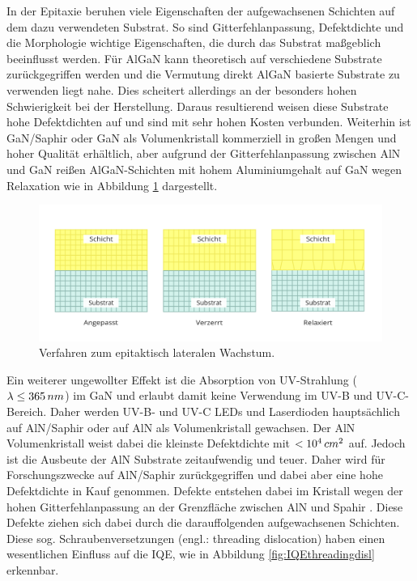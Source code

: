 In der Epitaxie beruhen viele Eigenschaften der aufgewachsenen Schichten auf dem dazu verwendeten Substrat. So sind Gitterfehlanpassung, Defektdichte und die Morphologie wichtige Eigenschaften, die durch das Substrat maßgeblich beeinflusst werden. Für AlGaN kann theoretisch auf verschiedene Substrate zurückgegriffen werden und die Vermutung direkt AlGaN basierte Substrate zu verwenden liegt nahe. Dies scheitert allerdings an der besonders hohen Schwierigkeit bei der Herstellung. Daraus resultierend weisen diese Substrate hohe Defektdichten auf und sind mit sehr hohen Kosten verbunden. Weiterhin ist GaN/Saphir oder GaN als Volumenkristall kommerziell in großen Mengen und hoher Qualität erhältlich, aber aufgrund der Gitterfehlanpassung zwischen AlN und GaN reißen AlGaN-Schichten mit hohem Aluminiumgehalt auf GaN wegen Relaxation \cite{problem} wie in Abbildung \ref{fig:wachstum} dargestellt.
\begin{figure}[h]
    \centering
    \begin{minipage}[t]{1\linewidth}
    \centering
    \includegraphics[width=1\linewidth]{Bilder/wachstumsarten.png}
    \end{minipage}%
    \caption{Verfahren zum epitaktisch lateralen Wachstum.}
     \label{fig:wachstum}
\end{figure} 
Ein weiterer ungewollter Effekt ist die Absorption von UV-Strahlung ($\lambda \leq 365 \thinspace nm$) im GaN und erlaubt damit keine Verwendung im UV-B und UV-C-Bereich. Daher werden UV-B- und UV-C LEDs und Laserdioden hauptsächlich auf AlN/Saphir oder auf AlN als Volumenkristall gewachsen. Der AlN Volumenkristall weist dabei die kleinste Defektdichte mit $<10^4 \thinspace cm^2$ auf. Jedoch ist die Ausbeute der AlN Substrate zeitaufwendig und teuer. Daher wird für Forschungszwecke auf AlN/Saphir zurückgegriffen und dabei aber eine hohe Defektdichte in Kauf genommen. Defekte entstehen dabei im Kristall wegen der hohen Gitterfehlanpassung an der Grenzfläche zwischen AlN und Spahir \cite{pohl}. Diese Defekte ziehen sich dabei durch die darauffolgenden aufgewachsenen Schichten. Diese sog. Schraubenversetzungen (engl.: threading dislocation) haben einen wesentlichen Einfluss auf die IQE, wie in Abbildung \ref{fig:IQEthreadingdisl} erkennbar. 
